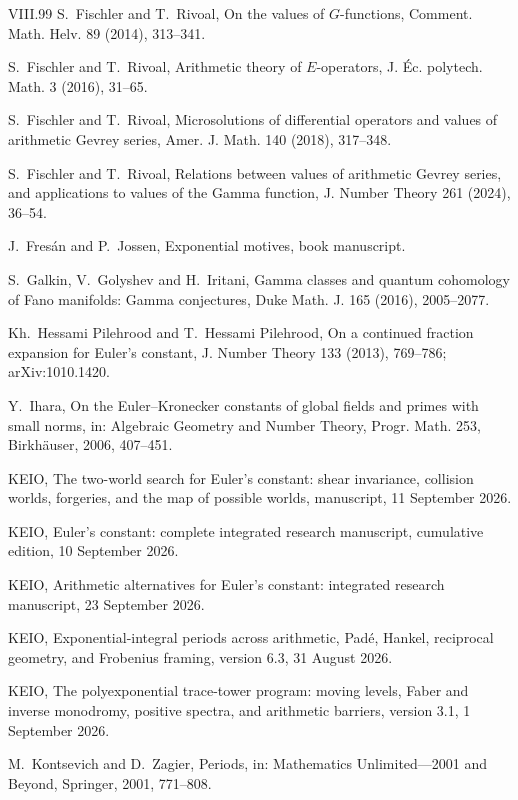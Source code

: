 \documentclass[11pt,a4paper]{article}
\theoremstyle{definition}
\theoremstyle{remark}
\numberwithin{equation}{section}
\begin{document}
\begin{thebibliography}{VIII.99}
 S.~Fischler and T.~Rivoal, On the values of $G$-functions, Comment. Math. Helv. 89 (2014), 313--341.

 S.~Fischler and T.~Rivoal, Arithmetic theory of $E$-operators, J. \'Ec. polytech. Math. 3 (2016), 31--65.

 S.~Fischler and T.~Rivoal, Microsolutions of differential operators and values of arithmetic Gevrey series, Amer. J. Math. 140 (2018), 317--348.

 S.~Fischler and T.~Rivoal, Relations between values of arithmetic Gevrey series, and applications to values of the Gamma function, J. Number Theory 261 (2024), 36--54.

 J.~Fres\'an and P.~Jossen, Exponential motives, book manuscript.

 S.~Galkin, V.~Golyshev and H.~Iritani, Gamma classes and quantum cohomology of Fano manifolds: Gamma conjectures, Duke Math. J. 165 (2016), 2005--2077.

 Kh.~Hessami Pilehrood and T.~Hessami Pilehrood, On a continued fraction expansion for Euler's constant, J. Number Theory 133 (2013), 769--786; arXiv:1010.1420.

 Y.~Ihara, On the Euler--Kronecker constants of global fields and primes with small norms, in: Algebraic Geometry and Number Theory, Progr. Math. 253, Birkh\"auser, 2006, 407--451.

 KEIO, The two-world search for Euler's constant: shear invariance, collision worlds, forgeries, and the map of possible worlds, manuscript, 11 September 2026.

 KEIO, Euler's constant: complete integrated research manuscript, cumulative edition, 10 September 2026.

 KEIO, Arithmetic alternatives for Euler's constant: integrated research manuscript, 23 September 2026.

 KEIO, Exponential-integral periods across arithmetic, Pad\'e, Hankel, reciprocal geometry, and Frobenius framing, version 6.3, 31 August 2026.

 KEIO, The polyexponential trace-tower program: moving levels, Faber and inverse monodromy, positive spectra, and arithmetic barriers, version 3.1, 1 September 2026.

 M.~Kontsevich and D.~Zagier, Periods, in: Mathematics Unlimited---2001 and Beyond, Springer, 2001, 771--808.


\end{thebibliography}
\end{document}
